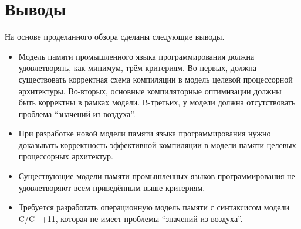 
\section{Выводы}
На основе проделанного обзора сделаны следующие выводы.
\begin{itemize}
  \item Модель памяти промышленного языка программирования должна удовлетворять, как минимум, трём критериям.
    Во-первых, должна существовать корректная схема компиляции в модель целевой процессорной
    архитектуры.
    Во-вторых, основные компиляторные оптимизации должны быть корректны в рамках модели.
    В-третьих, у модели должна отсутствовать проблема ``значений из воздуха''.
  \item При разработке новой модели памяти языка программирования нужно доказывать корректность эффективной компиляции
     в модели памяти целевых процессорных архитектур.
  \item Существующие модели памяти промышленных языков программирования не удовлетворяют всем приведённым выше
    критериям.
  \item Требуется разработать операционную модель памяти с синтаксисом модели C/C++11, которая
    не имеет проблемы ``значений из воздуха''.
\end{itemize}
